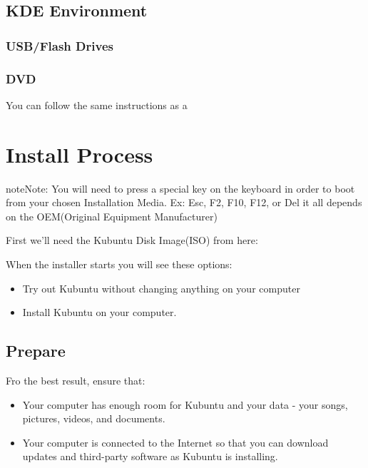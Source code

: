 \documentclass[letterpaper,10pt,english]{sphinxmanual}
\begin{document}
\subsection{KDE Environment}
\label{\detokenize{docs/installation:kde-environment}}

\subsubsection{USB/Flash Drives}
\label{\detokenize{docs/installation:id5}}

\subsubsection{DVD}
\label{\detokenize{docs/installation:id6}}
You can follow the same instructions as a {\hyperref[\detokenize{docs/installation:kubuntu-install-link}]{}}


\section{Install Process}
\label{\detokenize{docs/installation:install-process}}
\begin{sphinxadmonition}{note}{Note:}
You will need to press a special key on the keyboard in order to boot from your chosen Installation Media. Ex: Esc, F2, F10, F12, or Del it all depends on the OEM(Original Equipment Manufacturer)
\end{sphinxadmonition}

First we’ll need the Kubuntu Disk Image(ISO) from here: {\hyperref[\detokenize{docs/installation:get-kubuntu-link}]{}}


When the installer starts you will see these options:
\begin{itemize}
\item {} 
Try out Kubuntu without changing anything on your computer

\item {} 
Install Kubuntu on your computer.

\end{itemize}


\subsection{Prepare}
\label{\detokenize{docs/installation:prepare}}
Fro the best result, ensure that:
\begin{itemize}
\item {} 
Your computer has enough room for Kubuntu and your data - your songs, pictures, videos, and documents.

\item {} 
Your computer is connected to the Internet so that you can download updates and third-party software as Kubuntu is installing.

\end{itemize}
\end{document}
